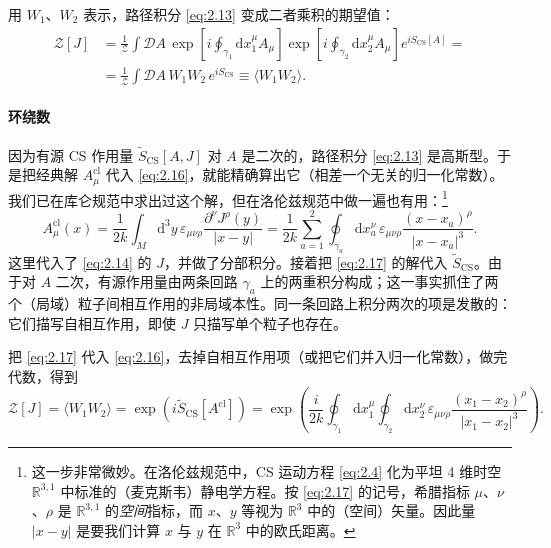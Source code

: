 \documentclass[11pt,a4paper]{article}
\newcommand{\R}{\mathbb{R}}
\newcommand{\dd}{\mathrm{d}}
\begin{document}
用 $W_1$、$W_2$ 表示，路径积分 \eqref{eq:2.13} 变成二者乘积的期望值：
\begin{equation}\tag{2.16}\label{eq:2.16}
  \begin{aligned}
  \mathcal{Z}[J] &= \frac{1}{\mathcal{Z}}\int\mathcal{D}A\,\exp\left[i\oint_{\gamma_1}\dd x_1^\mu A_\mu\right]\exp\left[i\oint_{\gamma_2}\dd x_2^\mu A_\mu\right]e^{iS_{\mathrm{CS}}[A]} = \\
  &= \frac{1}{\mathcal{Z}}\int\mathcal{D}A\,W_1W_2\,e^{iS_{\mathrm{CS}}} \equiv \langle W_1W_2\rangle .
  \end{aligned}
\end{equation}

\paragraph{环绕数} %
因为有源 CS 作用量 $\widetilde{S}_{\mathrm{CS}}[A,J]$ 对 $A$ 是二次的，路径积分 \eqref{eq:2.13} 是高斯型。于是把经典解 $A_\mu^{\mathrm{cl}}$ 代入 \eqref{eq:2.16}，就能精确算出它（相差一个无关的归一化常数）。我们已在库仑规范中求出过这个解，但在洛伦兹规范中做一遍也有用：\footnote{这一步非常微妙。在洛伦兹规范中，CS 运动方程 \eqref{eq:2.4} 化为平坦 4 维时空 $\R^{3,1}$ 中标准的（麦克斯韦）静电学方程。按 \eqref{eq:2.17} 的记号，希腊指标 $\mu$、$\nu$、$\rho$ 是 $\R^{3,1}$ 的\emph{空间}指标，而 $x$、$y$ 等视为 $\R^3$ 中的（空间）矢量。因此量 $|x-y|$ 是要我们计算 $x$ 与 $y$ 在 $\R^3$ 中的欧氏距离。}
\begin{equation}\tag{2.17}\label{eq:2.17}
  A_\mu^{\mathrm{cl}}(x) = \frac{1}{2k}\int_M \dd^3y\,\varepsilon_{\mu\nu\rho}\frac{\partial^\nu J^\rho(y)}{|x-y|}
  = \frac{1}{2k}\sum_{a=1}^{2}\oint_{\gamma_a}\dd x_a^\nu\,\varepsilon_{\mu\nu\rho}\frac{(x-x_a)^\rho}{|x-x_a|^3} .
\end{equation}
这里代入了 \eqref{eq:2.14} 的 $J$，并做了分部积分。接着把 \eqref{eq:2.17} 的解代入 $\widetilde{S}_{\mathrm{CS}}$。由于对 $A$ 二次，有源作用量由两条回路 $\gamma_a$ 上的两重积分构成；这一事实抓住了两个（局域）粒子间相互作用的非局域本性。同一条回路上积分两次的项是发散的：它们描写自相互作用，即使 $J$ 只描写单个粒子也存在。

把 \eqref{eq:2.17} 代入 \eqref{eq:2.16}，去掉自相互作用项（或把它们并入归一化常数），做完代数，得到
\begin{equation}\tag{2.18}\label{eq:2.18}
  \mathcal{Z}[J] = \langle W_1W_2\rangle = \exp\left(i\widetilde{S}_{\mathrm{CS}}[A^{\mathrm{cl}}]\right)
  = \exp\left(\frac{i}{2k}\oint_{\gamma_1}\dd x_1^\mu\oint_{\gamma_2}\dd x_2^\nu\,\varepsilon_{\mu\nu\rho}\frac{(x_1-x_2)^\rho}{|x_1-x_2|^3}\right).
\end{equation}
\end{document}
